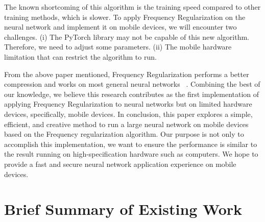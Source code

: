 \documentclass{article}
\begin{document}

The known shortcoming of this algorithm is the training speed compared to other training methods, which is slower. To apply Frequency Regularization on the neural network and implement it on mobile devices, we will encounter two challenges. (i) The PyTorch library may not be capable of this new algorithm. Therefore, we need to adjust some parameters. (ii) The mobile hardware limitation that can restrict the algorithm to run. 

From the above paper mentioned, Frequency Regularization performs a better compression and works on most general neural networks ~\cite{zhao2023frequency}. Combining the best of our knowledge, we believe this research contributes as the first implementation of applying Frequency Regularization to neural networks but on limited hardware devices, specifically, mobile devices.
In conclusion, this paper explores a simple, efficient, and creative method to run a large neural network on mobile devices based on the Frequency regularization algorithm. Our purpose is not only to accomplish this implementation, we want to ensure the performance is similar to the result running on high-specification hardware such as computers. We hope to provide a fast and secure neural network application experience on mobile devices.

\section{Brief Summary of Existing Work}
\end{document}
